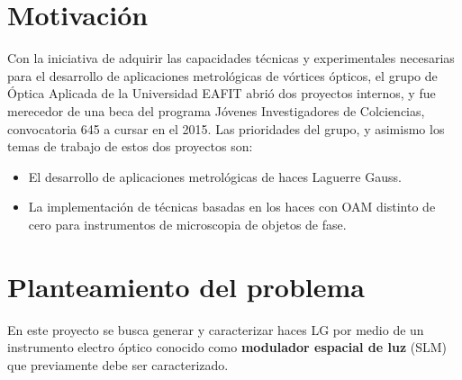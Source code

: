 \section{Motivación\label{sec:motiv}}

Con la iniciativa de adquirir las capacidades técnicas y experimentales
necesarias para el desarrollo de aplicaciones metrológicas de vórtices
ópticos, el grupo de Óptica 
Aplicada de la Universidad EAFIT abrió dos proyectos internos, y
fue merecedor de una beca del programa Jóvenes Investigadores de Colciencias,
convocatoria 645 a cursar en el 2015.  
Las prioridades del grupo, y asimismo los temas de trabajo de estos
dos proyectos son: 
\begin{itemize}
\item El desarrollo de aplicaciones metrológicas de haces Laguerre
  Gauss. 
\item La implementación de técnicas basadas en los haces con OAM
  distinto de cero para instrumentos de microscopia de objetos de fase. 
\end{itemize}

\section{Planteamiento del problema}

\label{sec:planteamiento}

En este proyecto se busca generar y caracterizar haces LG por medio de
un instrumento electro óptico conocido como \textbf{modulador espacial de luz}
(\acrshort{SLM}) que previamente debe ser caracterizado. 



